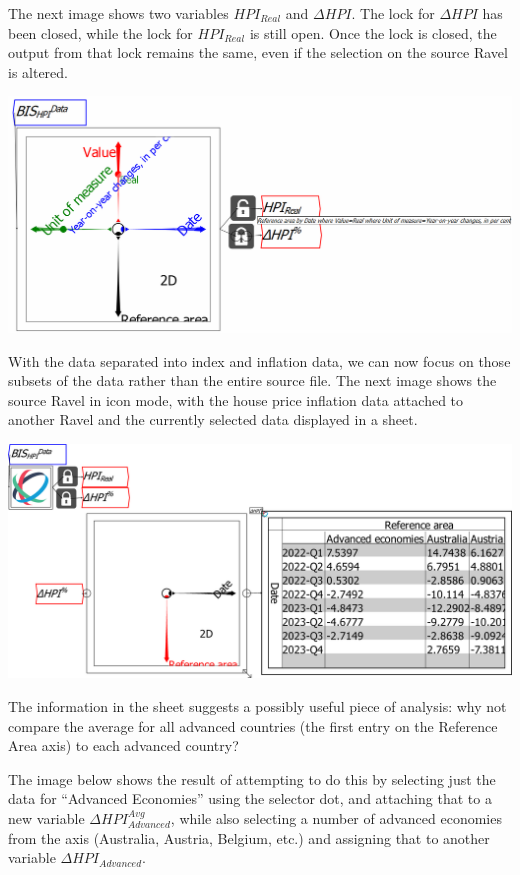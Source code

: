 The next image shows two variables $HPI_{Real}$ and $\Delta{HPI}$.
The lock for $\Delta{HPI}$ has been closed, while the lock for $HPI_{Real}$
is still open. Once the lock is closed, the output from that lock
remains the same, even if the selection on the source Ravel is altered.

\noindent\includegraphics[width=\textwidth]{images/tut05HPIandInflationSeparatedLocks}

With the data separated into index and inflation data, we can now
focus on those subsets of the data rather than the entire source file.
The next image shows the source Ravel in icon mode, with the house
price inflation data attached to another Ravel and the currently selected
data displayed in a sheet.

\noindent\includegraphics[width=\textwidth]{images/tut06HPIwithVariablesAssigned02DeltaHPI}

The information in the sheet suggests a possibly useful piece of analysis:
why not compare the average for all advanced countries (the first
entry on the Reference Area axis) to each advanced country?

The image below shows the result of attempting to do this by selecting
just the data for ``Advanced Economies'' using the selector dot, and
attaching that to a new variable $\Delta{HPI}_{Advanced}^{Avg}$,
while also selecting a number of advanced economies from the axis
(Australia, Austria, Belgium, etc.) and assigning that to another
variable $\Delta{HPI}_{Advanced}$.

